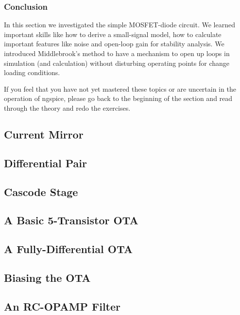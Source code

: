 \documentclass[
  a4paper,
  DIV=11,
  numbers=noendperiod]{scrartcl}
\begin{document}
\subsubsection{Conclusion}\label{conclusion-1}

In this section we investigated the simple MOSFET-diode circuit. We
learned important skills like how to derive a small-signal model, how to
calculate important features like noise and open-loop gain for stability
analysis. We introduced Middlebrook's method to have a mechanism to open
up loops in simulation (and calculation) without disturbing operating
points for change loading conditions.

If you feel that you have not yet mastered these topics or are uncertain
in the operation of ngspice, please go back to the beginning of the
section and read through the theory and redo the exercises.

\subsection{Current Mirror}\label{current-mirror}

\subsection{Differential Pair}\label{differential-pair}

\subsection{Cascode Stage}\label{cascode-stage}

\subsection{A Basic 5-Transistor OTA}\label{a-basic-5-transistor-ota}

\subsection{A Fully-Differential OTA}\label{a-fully-differential-ota}

\subsection{Biasing the OTA}\label{biasing-the-ota}

\subsection{An RC-OPAMP Filter}\label{an-rc-opamp-filter}
\end{document}
